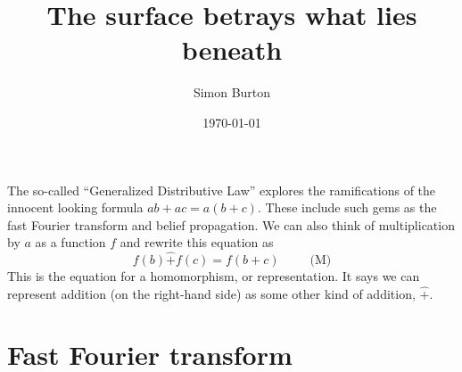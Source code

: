 \documentclass[12pt]{article}
\begin{document}
\title{The surface betrays what lies beneath}

\author{Simon Burton}

\date{\today}


\maketitle


\def\Complex{\mathbb{C}}
\def\Z{\mathbb{Z}}
\def\Ham{\mathcal{H}}
\def\Pauli{\mathcal{P}}
\def\Spec{\mbox{Spec}}
\def\Proveit{{\it (Proof??)}}
\def\GL{\mathrm{GL}}
\def\half{\frac{1}{2}}
\def\Stab{S}



%
%


The so-called ``Generalized Distributive Law''
\cite{Aji2000}
explores the ramifications of the innocent looking
formula $ab+ac = a(b+c).$
These include such gems as the fast Fourier transform
and belief propagation.
We can also think of multiplication by $a$ as a function $f$
and rewrite this equation as 
$$
    f(b)\hat{+}f(c)=f(b+c) \ \ \ \ \ \ \ \ \ \ \ \mbox{(M)}
$$
This is the equation for a homomorphism, or representation.
It says we can represent addition (on the right-hand side)
as some other kind of addition, $\hat{+}.$

\section{Fast Fourier transform}

\end{document}
